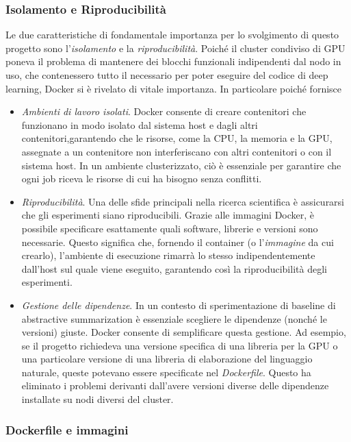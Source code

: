 \documentclass[12pt,a4paper,twoside,openright]{book}
\begin{document}
\subsubsection{Isolamento e Riproducibilità}
Le due caratteristiche di fondamentale importanza per lo svolgimento di questo progetto sono l'\emph{isolamento} e la \emph{riproducibilità}. Poiché il cluster condiviso di GPU poneva il problema di mantenere dei blocchi funzionali indipendenti dal nodo in uso, che contenessero tutto il necessario per poter eseguire del codice di deep learning, Docker si è rivelato di vitale importanza. In particolare poiché fornisce
\begin{itemize}
    \item \emph{Ambienti di lavoro isolati}. Docker consente di creare contenitori che funzionano in modo isolato dal sistema host e dagli altri contenitori,garantendo che le risorse, come la CPU, la memoria e la GPU, assegnate a un contenitore non interferiscano con altri contenitori o con il sistema host. In un ambiente clusterizzato, ciò è essenziale per garantire che ogni job riceva le risorse di cui ha bisogno senza conflitti.
    \item \emph{Riproducibilità}. Una delle sfide principali nella ricerca scientifica è assicurarsi che gli esperimenti siano riproducibili. Grazie alle immagini Docker, è possibile specificare esattamente quali software, librerie e versioni sono necessarie. Questo significa che, fornendo il container (o l'\emph{immagine} da cui crearlo), l'ambiente di esecuzione rimarrà lo stesso indipendentemente dall'host sul quale viene eseguito, garantendo così la riproducibilità degli esperimenti.

    \item \emph{Gestione delle dipendenze}. In un contesto di sperimentazione di baseline di abstractive summarization è essenziale scegliere le dipendenze (nonché le versioni) giuste. Docker consente di semplificare questa gestione. Ad esempio, se il progetto richiedeva una versione specifica di una libreria per la GPU o una particolare versione di una libreria di elaborazione del linguaggio naturale, queste potevano essere specificate nel \emph{Dockerfile}. Questo ha eliminato i problemi derivanti dall'avere versioni diverse delle dipendenze installate su nodi diversi del cluster.
\end{itemize}


\subsubsection{Dockerfile e immagini}
\end{document}
